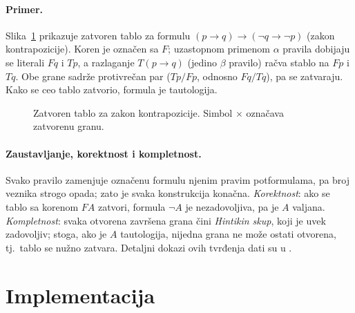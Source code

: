 \documentclass[a4paper,10pt]{article}
\begin{document}
\paragraph{Primer.}
Slika~\ref{fig:tablo} prikazuje zatvoren tablo za formulu
$(p \rightarrow q) \rightarrow (\neg q \rightarrow \neg p)$ (zakon kontrapozicije).
Koren je označen sa $F$; uzastopnom primenom $\alpha$ pravila dobijaju se
literali $Fq$ i $Tp$, a razlaganje $T(p \rightarrow q)$ (jedino $\beta$ pravilo)
račva stablo na $Fp$ i $Tq$. Obe grane sadrže protivrečan par ($Tp/Fp$, odnosno
$Fq/Tq$), pa se zatvaraju. Kako se ceo tablo zatvorio, formula je tautologija.

\begin{figure}[ht]
\centering
{}
\caption{Zatvoren tablo za zakon kontrapozicije. Simbol $\times$ označava
zatvorenu granu.}
\label{fig:tablo}
\end{figure}

\paragraph{Zaustavljanje, korektnost i kompletnost.}
Svako pravilo zamenjuje označenu formulu njenim pravim potformulama, pa broj
veznika strogo opada; zato je svaka konstrukcija konačna. \emph{Korektnost}:
ako se tablo sa korenom $FA$ zatvori, formula $\neg A$ je nezadovoljiva, pa je
$A$ valjana. \emph{Kompletnost}: svaka otvorena završena grana čini
\emph{Hintikin skup}, koji je uvek zadovoljiv; stoga, ako je $A$ tautologija,
nijedna grana ne može ostati otvorena, tj.\ tablo se nužno zatvara. Detaljni
dokazi ovih tvrđenja dati su u \cite{smullyan, fitting}.

\section{Implementacija}
\label{sec:implementacija}
\end{document}
